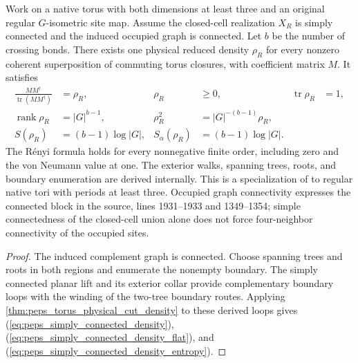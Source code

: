 \begin{lemma}%
    \label{thm:peps_torus_simply_connected_physical_density}
    \leanok
    Work on a native torus with both dimensions at least three and
    an original regular $G$-isometric site map. Assume the
    closed-cell realization $X_R$ is simply connected and the induced
    occupied graph is connected. Let $b$ be the number of crossing
    bonds. There exists one physical reduced density
    $\rho_R$ for every nonzero coherent superposition of commuting
    torus closures, with coefficient matrix $M$. It satisfies
    \begin{align}
        \frac{MM^\dagger}{\operatorname{tr}(MM^\dagger)} & =\rho_R,             &
        \rho_R                                           & \geq0,               & \operatorname{tr}\rho_R & =1,
        \label{eq:peps_simply_connected_density}                                                                \\
        \operatorname{rank}\rho_R                        & =|G|^{b-1},          &
        \rho_R^2                                         & =|G|^{-(b-1)}\rho_R,
        \label{eq:peps_simply_connected_density_flat}                                                           \\
        S(\rho_R)                                        & =(b-1)\log|G|,       &
        S_\alpha(\rho_R)                                 & =(b-1)\log|G|.
        \label{eq:peps_simply_connected_density_entropy}
    \end{align}
    The R\'enyi formula holds for every nonnegative finite order,
    including zero and the von Neumann value at one.
    The exterior walks, spanning trees, roots, and boundary enumeration
    are derived internally. This is a specialization of
    \cite[Theorem~6.9]{Schuch2010PEPS} to regular native tori with
    periods at least three. Occupied graph connectivity expresses
    the connected block in the source, lines 1931--1933 and
    1349--1354; simple connectedness of the closed-cell union alone
    does not force four-neighbor connectivity of the occupied sites.
\end{lemma}

\begin{proof}\leanok
    The induced complement graph is connected. Choose spanning trees
    and roots in both regions and enumerate the nonempty boundary.
    The simply connected planar lift and its exterior collar provide
    complementary boundary loops with the winding of the two-tree
    boundary routes. Applying
    \ref{thm:peps_torus_physical_cut_density} to these derived loops
    gives (\ref{eq:peps_simply_connected_density}),
    (\ref{eq:peps_simply_connected_density_flat}), and
    (\ref{eq:peps_simply_connected_density_entropy}).
\end{proof}

